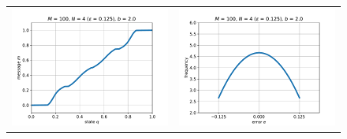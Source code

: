\documentclass[12pt]{article}
\begin{document}
\begin{figure}[h]
	\begin{center}
		\begin{tabular}{cc}
			\includegraphics[scale=.5]{msg1} & \includegraphics[scale=.5]{err1} \\

\end{tabular}
\end{center}
\end{figure}
\end{document}
